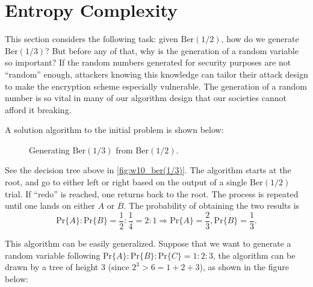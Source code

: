\section{Entropy Complexity}

This section considers the following task: given $\mathrm{Ber}(1/2)$, how do we generate $\mathrm{Ber}(1/3)$? But before any of that, why is the generation of a random variable so important? If the random numbers generated for security purposes are not ``random'' enough, attackers knowing this knowledge can tailor their attack design to make the encryption scheme especially vulnerable. The generation of a random number is so vital in many of our algorithm design that our societies cannot afford it breaking.

A solution algorithm to the initial problem is shown below:

\begin{figure}[H]
    \centering
    \caption{Generating $\mathrm{Ber}(1/3)$ from $\mathrm{Ber}(1/2)$.}
    \label{fig:w10_ber(1/3)}
\end{figure}

See the decision tree above in \autoref{fig:w10_ber(1/3)}. The algorithm starts at the root, and go to either left or right based on the output of a single $\mathrm{Ber}(1/2)$ trial. If ``redo'' is reached, one returns back to the root. The process is repeated until one lands on either $A$ or $B$. The probability of obtaining the two results is
\begin{equation*}
    \mathrm{Pr}\{A\}:\mathrm{Pr}\{B\} = \frac{1}{2}:\frac{1}{4}=2:1 \Rightarrow \mathrm{Pr}\{A\} = \frac{2}{3}, \mathrm{Pr}\{B\}=\frac{1}{3}.
\end{equation*}

This algorithm can be easily generalized. Suppose that we want to generate a random variable following $\mathrm{Pr}\{A\}:\mathrm{Pr}\{B\}:\mathrm{Pr}\{C\} = 1:2:3$, the algorithm can be drawn by a tree of height 3 (since $2^3 > 6 = 1 + 2 + 3$), as shown in the figure below:

